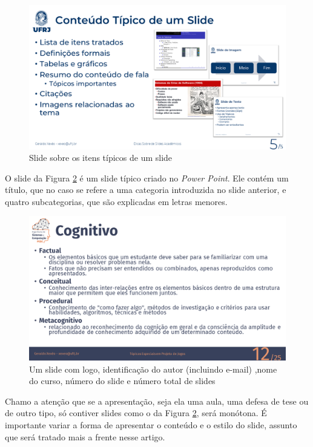 \begin{figure}
    \centering
    \includegraphics[width=0.7\linewidth]{imagens/itenstipicos}
    \caption{Slide sobre os itens típicos de um slide}
    \label{fig:itenstipicos}
\end{figure}



O slide da Figura \ref{fig:coppe} é um slide típico criado no \textit{Power Point}. Ele contém um título, que no caso se refere a uma categoria introduzida no slide anterior, e quatro subcategorias, que são explicadas em letras menores.

\begin{figure}[htb]
    \centering
    \includegraphics[width=\tam\linewidth,frame]{imagens/slideexemplotepj.png}
    \caption{Um slide com logo, identificação do autor (incluindo e-mail) ,nome do curso,   número do slide e número total de slides}
    \label{fig:coppe}
\end{figure}

Chamo a atenção que se a apresentação, seja ela uma aula, uma defesa de tese ou de outro tipo, só contiver slides como o da Figura \ref{fig:coppe},  será monótona. É importante variar a forma de apresentar o conteúdo e o estilo do slide, assunto que será tratado mais a frente nesse artigo.

